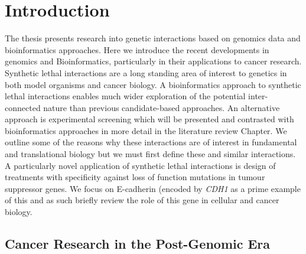 \chapter{Introduction}
\label{chap:intro}



The thesis presents research into genetic interactions based on genomics data and bioinformatics approaches. Here we introduce the recent developments in genomics and Bioinformatics, particularly in their applications to cancer research. Synthetic lethal interactions are a long standing area of interest to genetics in both model organisms and cancer biology. A bioinformatics approach to synthetic lethal interactions enables much wider exploration of the potential inter-connected nature than previous candidate-based approaches. An alternative approach is experimental screening which will be presented and contrasted with bioinformatics approaches in more detail in the literature review Chapter. We outline some of the reasons why these interactions are of interest in fundamental and translational biology but we must first define these and similar interactions. A particularly novel application of synthetic lethal interactions is design of treatments with specificity against loss of function mutations in tumour suppressor genes. We focus on E-cadherin (encoded by \textit{CDH1} as a prime example of this and as such briefly review the role of this gene in cellular and cancer biology.   



\section{Cancer Research in the Post-Genomic Era}

